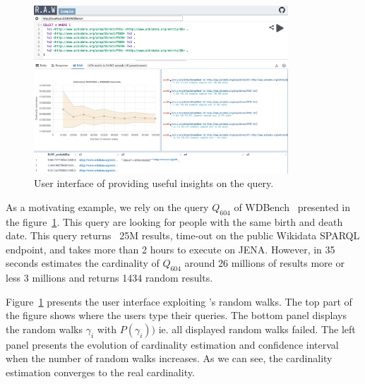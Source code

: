 
 \begin{figure}
   \centering
   \includegraphics[width=0.85\textwidth]{figures/raw_screenshot.png}
   \caption{\label{fig:raw_screenshot}User interface of \NAME providing useful insights on the query.}
 \end{figure}


 As a motivating example, we rely on the query $Q_{604}$ of
 WDBench~\cite{angles2022wdbench} presented in the
 figure~\ref{fig:raw_screenshot}. This query are looking for people
 with the same birth and death date. This query returns ~25M results,
 time-out on the public Wikidata SPARQL endpoint, and takes more than
 2 hours to execute on JENA. However, in 35 seconds \NAME estimates the
 cardinality of $Q_{604}$ around 26 millions of results more or less 3
 millions and returns 1434 random results.

 
 Figure~\ref{fig:raw_screenshot} presents the user interface
 exploiting \NAME's random walks. The top part of the figure shows
 where the users type their queries. The bottom panel displays the
 random walks $\gamma_i$ with $P(\gamma_i))$ ie. all displayed random
 walks failed.  The left panel presents the evolution of cardinality
 estimation and confidence interval when the number of random walks
 increases. As we can see, the cardinality estimation converges to the
 real cardinality.


